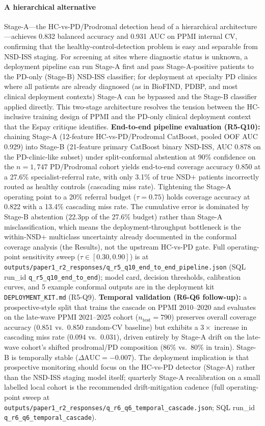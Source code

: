 \documentclass[10pt,letterpaper]{article}
\begin{document}
\paragraph*{A hierarchical alternative} Stage-A---the HC-vs-PD/Prodromal detection head of a hierarchical architecture---achieves 0.832 balanced accuracy and 0.931 AUC on PPMI internal CV, confirming that the healthy-control-detection problem is easy and separable from NSD-ISS staging. For screening at sites where diagnostic status is unknown, a deployment pipeline can run Stage-A first and pass Stage-A-positive patients to the PD-only (Stage-B) NSD-ISS classifier; for deployment at specialty PD clinics where all patients are already diagnosed (as in BioFIND, PDBP, and most clinical deployment contexts) Stage-A can be bypassed and the Stage-B classifier applied directly. This two-stage architecture resolves the tension between the HC-inclusive training design of PPMI and the PD-only clinical deployment context that the Espay critique identifies. \textbf{End-to-end pipeline evaluation (R5-Q10):} chaining Stage-A (12-feature HC-vs-PD/Prodromal CatBoost, pooled OOF AUC 0.929) into Stage-B (21-feature primary CatBoost binary NSD-ISS, AUC 0.878 on the PD-clinic-like subset) under split-conformal abstention at 90\% confidence on the $n{=}1{,}747$ PD/Prodromal cohort yields end-to-end coverage accuracy 0.850 at a 27.6\% specialist-referral rate, with only 3.1\% of true NSD$+$ patients incorrectly routed as healthy controls (cascading miss rate). Tightening the Stage-A operating point to a 20\% referral budget ($\tau{=}0.75$) holds coverage accuracy at 0.822 with a 13.4\% cascading miss rate. The cumulative error is dominated by Stage-B abstention (22.3pp of the 27.6\% budget) rather than Stage-A misclassification, which means the deployment-throughput bottleneck is the within-NSD$+$ multiclass uncertainty already documented in the conformal coverage analysis (the Results), not the upstream HC-vs-PD gate. Full operating-point sensitivity sweep ($\tau \in [0.30, 0.90]$) is at \texttt{outputs/paper1\_r2\_responses/q\_r5\_q10\_end\_to\_end\_pipeline.json} (SQL run\_id \texttt{q\_r5\_q10\_end\_to\_end}); model card, decision thresholds, calibration curves, and 5 example conformal outputs are in the deployment kit \texttt{DEPLOYMENT\_KIT.md} (R5-Q9). \textbf{Temporal validation (R6-Q6 follow-up):} a prospective-style split that trains the cascade on PPMI 2010--2020 and evaluates on the late-wave PPMI 2021--2025 cohort ($n_{\mathrm{test}}{=}790$) preserves overall coverage accuracy ($0.851$ vs.\ $0.850$ random-CV baseline) but exhibits a $3{\times}$ increase in cascading miss rate ($0.094$ vs.\ $0.031$), driven entirely by Stage-A drift on the late-wave cohort's shifted prodromal/PD composition (86\% vs.\ 80\% in train). Stage-B is temporally stable ($\Delta\mathrm{AUC} = -0.007$). The deployment implication is that prospective monitoring should focus on the HC-vs-PD detector (Stage-A) rather than the NSD-ISS staging model itself; quarterly Stage-A recalibration on a small labelled local cohort is the recommended drift-mitigation cadence (full operating-point sweep at \texttt{outputs/paper1\_r2\_responses/q\_r6\_q6\_temporal\_cascade.json}; SQL run\_id \texttt{q\_r6\_q6\_temporal\_cascade}).
\end{document}
